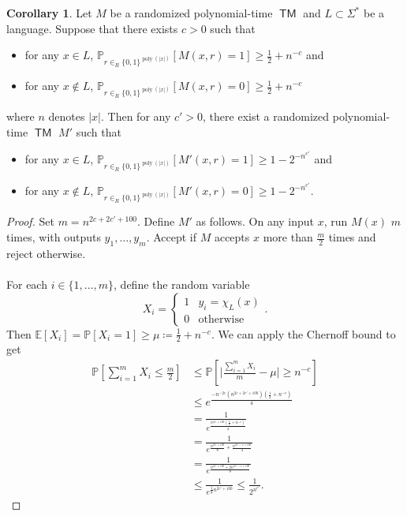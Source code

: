 \documentclass[10pt,letterpaper,cm]{nupset}
\theoremstyle{definition}
\newtheorem{corollary}{Corollary}
\newcommand{\1}{\mathbf{1}}
\newcommand{\0}{\vec 0}
\DeclareMathOperator{\TM}{\mathsf{TM}}
\DeclareMathOperator{\poly}{poly}
\begin{document}
\begin{corollary}
Let $M$ be a randomized polynomial-time $\TM$ and $L\subset \Sigma^{\ast}$ be a language. Suppose that there exists $c>0$ such that
\begin{itemize}
\item for any $x\in L$, $\mathbb{P}_{r\in_R \{0,1\}^{\poly(\lvert{x}\rvert)}}[M(x,r)=1] \geq \frac{1}{2} +n^{-c}$ and
\item for any $x\notin L$, $\mathbb{P}_{r\in_R \{0,1\}^{\poly(\lvert{x}\rvert)}}[M(x,r)=0] \geq \frac{1}{2} + n^{-c}$
\end{itemize} where $n$ denotes $|x|$.
Then for any $c' >0$, there exist a randomized polynomial-time $\TM$ $M'$ such that 
\begin{itemize}
\item for any $x\in L$, $\mathbb{P}_{r\in_R \{0,1\}^{\poly(\lvert{x}\rvert)}}[M'(x,r)=1] \geq 1 - 2^{{-}n^{c'}}$ and
\item for any $x\notin L$, $\mathbb{P}_{r\in_R \{0,1\}^{\poly(\lvert{x}\rvert)}}[M'(x,r)=0] \geq 1 - 2^{{-}n^{c'}}$.
\end{itemize}
\end{corollary}
\begin{proof}
Set $m = n^{2c + 2c' + 100}$. Define $M'$ as follows. On any input $x$, run $M(x)$ $m$ times, with outputs $y_1, \ldots, y_m$. Accept if $M$ accepts $x$ more than $\frac{m}{2}$ times and reject otherwise.
\\ \\  For each $i\in \{1, \ldots, m\}$, define the random variable $$ X_i = \begin{cases} 1 & y_i = \chi_L(x) \\ 0 & \text{otherwise} \end{cases} .$$ Then $\mathbb{E}[X_i] = \mathbb{P}[X_i=1] \geq \mu\coloneqq \frac{1}{2} + n^{{-}c}$. We can apply the Chernoff bound to get   
\begin{align*}
 \mathbb{P}[\sum_{i=1}^m X_i \leq \frac{m}{2}] & \leq \mathbb{P}[ \big | \frac{\sum_{i=1}^m X_i}{m} -\mu \big | \geq n^{-c}] 
\\ & \leq
 e^{ \frac{ {-}n^{{-}2c}(n^{2c + 2c' + 100})(\frac{1}{2}+ n^{-c})}{4}
 }
 \\ & = \frac{1}{e^{\frac{ n^{2c' +100}(\frac{1}{2} + n^{{-}c} )                 }{  4   }}  }
 \\ & = \frac{1}{e^{ \frac{n^{2c' +100}}{8} +\frac{n^{2c' -c+100}}{4}          }}
 \\ & =  \frac{1}{e^{ \frac{n^{2c' +100} + 2 n^{2c' -c+100}}{8}       }}
 \\ &
 \leq \frac{1}{e^{\frac{1}{8}n^{2c' +100}}   }\leq \frac{1}{2^{n^{c'}}} . 
\end{align*} 
\end{proof}
\end{document}
